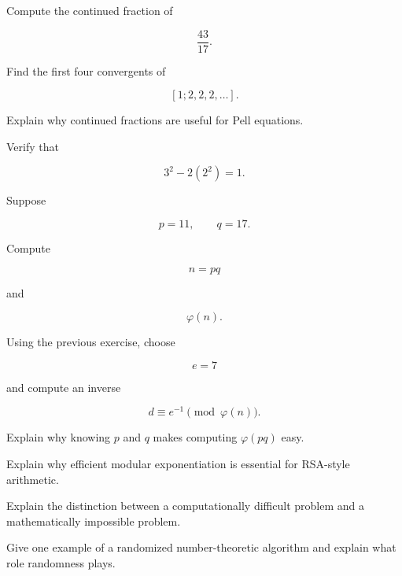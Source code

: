 \begin{exercise}[2]
Compute the continued fraction of

\[ \frac{43}{17}. \]
\end{exercise}

\begin{exercise}[2]
Find the first four convergents of

\[ [1;2,2,2,\ldots]. \]
\end{exercise}

\begin{exercise}[3]
Explain why continued fractions are useful for Pell equations.
\end{exercise}

\begin{exercise}[2]
Verify that

\[ 3^2-2(2^2)=1. \]
\end{exercise}

\begin{exercise}[2]
Suppose

\[ p=11,\qquad q=17. \]

Compute

\[ n=pq \]

and

\[ \varphi(n). \]
\end{exercise}

\begin{exercise}[2]
Using the previous exercise, choose

\[ e=7 \]

and compute an inverse

\[ d\equiv e^{-1}\pmod{\varphi(n)}. \]
\end{exercise}

\begin{exercise}[3]
Explain why knowing \(p\) and \(q\) makes computing \(\varphi(pq)\) easy.
\end{exercise}

\begin{exercise}[3]
Explain why efficient modular exponentiation is essential for RSA-style
arithmetic.
\end{exercise}

\begin{exercise}[2]
Explain the distinction between a computationally difficult problem and a
mathematically impossible problem.
\end{exercise}

\begin{exercise}[2]
Give one example of a randomized number-theoretic algorithm and explain what
role randomness plays.
\end{exercise}

